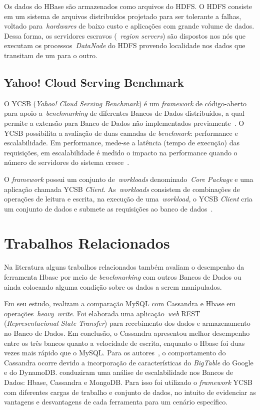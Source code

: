 \documentclass[12pt]{article}
\begin{document}
Os dados do HBase são armazenados como arquivos do HDFS. O HDFS consiste em um sistema de arquivos distribuídos projetado para ser tolerante a falhas, voltado para~\emph{hardwares} de baixo custo e aplicações com grande volume de dados. Dessa forma, os servidores escravos (~\emph{region servers}) são dispostos nos nós que executam os processos~\emph{DataNode} do HDFS provendo localidade nos dados que transitam de um para o outro.

\subsection{Yahoo! Cloud Serving Benchmark}
\label{subsec:ycsb}

O YCSB (\emph{Yahoo! Cloud Serving Benchmark}) é um \textit{framework} de código-aberto para apoio a~\emph{benchmarking} de diferentes Bancos de Dados distribuídos, a qual permite a extensão para Banco de Dados não implementados previamente~\cite{cooper2010benchmarking}. O YCSB possibilita a avaliação de duas camadas de \textit{benchmark}: performance e escalabilidade. Em performance, mede-se a latência (tempo de execução) das requisições, em escalabilidade é medido o impacto na performance quando o número de servidores do sistema cresce~\cite{cooper2010benchmarking}.

O \textit{framework} possui um conjunto de~\emph{workloads} denominado~\emph{Core Package} e uma aplicação chamada YCSB \textit{Client}. As~\emph{workloads} consistem de combinações de operações de leitura e escrita, na execução de uma~\emph{workload}, o YCSB \textit{Client} cria um conjunto de dados e submete as requisições ao banco de dados~\cite{cooper2010benchmarking}.

\section{Trabalhos Relacionados} 
\label{sec:relacionados}

Na literatura alguns trabalhos relacionados também avaliam o desempenho da ferramenta Hbase por meio de \textit{benchmarking} com outros Bancos de Dados ou ainda colocando alguma condição sobre os dados a serem manipulados.

Em seu estudo, \cite{jogi2016performance} realizam a comparação MySQL com Cassandra e Hbase em operações~\emph{heavy~\emph{write}}. Foi elaborada uma aplicação~\emph{web} REST (\emph{Representacional State Transfer}) para recebimento dos dados e armazenamento no Banco de Dados. Em conclusão, o Cassandra apresentou melhor desempenho entre os três bancos quanto a velocidade de escrita, enquanto o Hbase foi duas vezes mais rápido que o MySQL. Para os autores~\cite{jogi2016performance}, o comportamento do Cassandra ocorre devido a incorporação de características do \emph{BigTable} do Google e do DynamoDB. \cite{swaminathan2016quantitative} conduziram uma análise de escalabilidade nos Bancos de Dados: Hbase, Cassandra e MongoDB. Para isso foi utilizado o \textit{framework} YCSB com diferentes cargas de trabalho e conjunto de dados, no intuito de evidenciar as vantagens e desvantagens de cada ferramenta para um cenário específico.
\end{document}
